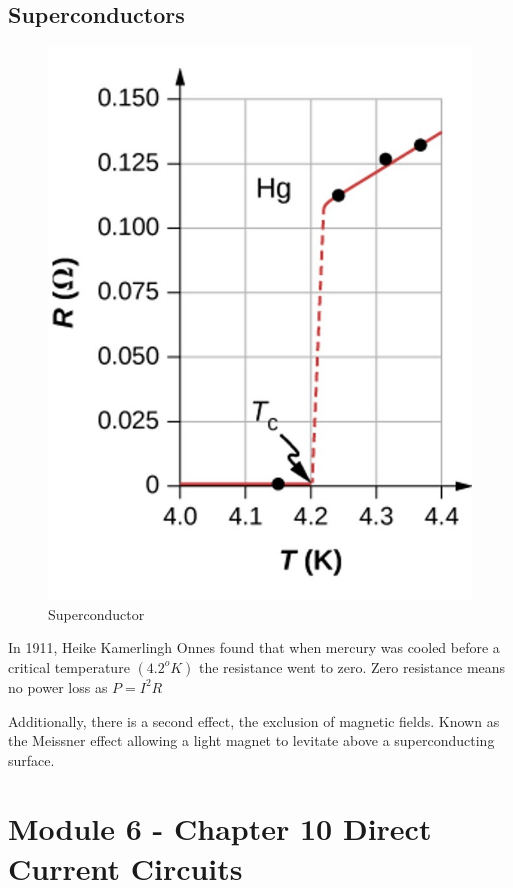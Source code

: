 \documentclass[14pt]{memoir}
\begin{document}
\section{Superconductors}

\begin{figure}[H]
\begin{center}
\includegraphics[scale=0.50]{fig/fig_09_27.jpg}
\caption{Superconductor}
\label{fig:09_27}
\end{center}
\end{figure}

In 1911, Heike Kamerlingh Onnes found that when mercury was cooled before a critical temperature $(4.2^o K)$ the resistance went to zero. Zero resistance means no power loss as $P = I^2R$

Additionally, there is a second effect, the exclusion of magnetic fields. Known as the Meissner effect allowing a light magnet to levitate above a superconducting surface. 

\chapter{Module 6 - Chapter 10 Direct Current Circuits}
\end{document}
